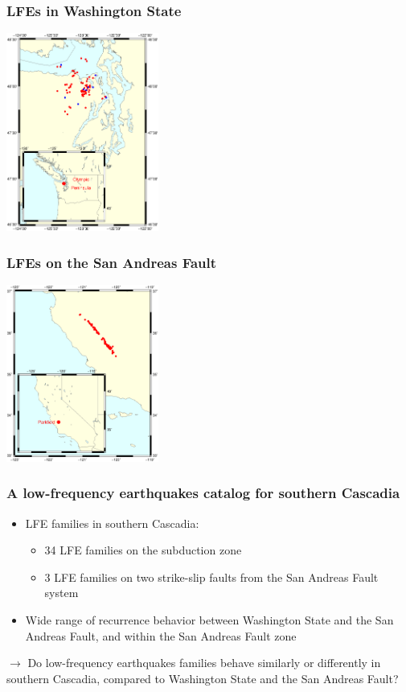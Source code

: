 \documentclass{beamer}
\begin{document}
	\begin{frame}
		\frametitle{LFEs in Washington State}
		\begin{center}
			\includegraphics[trim={1cm 4cm 2cm 2cm}, clip, width=5cm]{website/LFE/cascadia.eps}
		\end{center}
	\end{frame}

	\begin{frame}
		\frametitle{LFEs on the San Andreas Fault}
		\begin{center}
			\includegraphics[trim={1cm 4cm 1cm 4cm}, clip, width=5cm]{website/LFE/sanandreas.eps}
		\end{center}
	\end{frame}

	\begin{frame}
		\frametitle{A low-frequency earthquakes catalog for southern Cascadia}
		\begin{itemize}
			\item LFE families in southern Cascadia:
			\begin{itemize}
				\item 34 LFE families on the subduction zone
				\item 3 LFE families on two strike-slip faults from the San Andreas Fault system
			\end{itemize}
			\item Wide range of recurrence behavior between Washington State and the San Andreas Fault, and within the San Andreas Fault zone
		\end{itemize}
		
		\begin{block}{}
			$\rightarrow$ Do low-frequency earthquakes families behave similarly or differently in southern Cascadia, compared to Washington State and the San Andreas Fault?
		\end{block}
	\end{frame}
\end{document}
